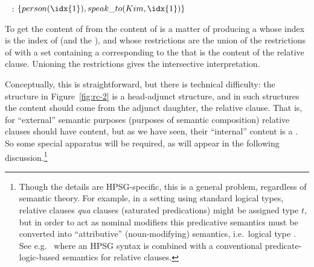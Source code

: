 \documentclass[output=paper,nonflat,draftmode]{./langsci/langscibook}
\begin{document}
\begin{exe}
     \ex\label{x:rc-38}~ : \ensuremath{\{person(\idx{1}),
        speak\_to(Kim,\idx{1})\}}
\end{exe}
To get the content of  from the content of  is a
matter of producing a  whose index is the index of  (and
the ), and whose restrictions are the union of the restrictions of
 with a set containing a  corresponding to the
 that is the content of the relative clause. Unioning the restrictions gives
the intersective interpretation.

Conceptually, this is straightforward, but there is technical difficulty: the structure in
Figure~\ref{fig:rc-2} is a head-adjunct structure, and in such structures the content should
come from the adjunct daughter, the relative clause. That is, for ``external'' semantic
purposes (purposes of semantic composition) relative clauses should have
 content, but as we have seen, their ``internal'' content is a
. So some special apparatus will be required, as will appear in the following
discussion.\footnote{Though the details are HPSG-specific, this is a general problem,
  regardless of semantic theory. For example, in a setting using standard logical types,
  relative clauses \emph{qua} clauses (saturated predications) might be assigned type $t$,
  but in order to act as nominal modifiers this predicative semantics must be converted
  into ``attributive'' (noun-modifying) semantics, i.e.\  logical type
  . See e.g.\ \cite[521--524]{Sag:10b} where an HPSG syntax is combined with a conventional
  predicate-logic-based semantics for relative clauses. }
\end{document}
